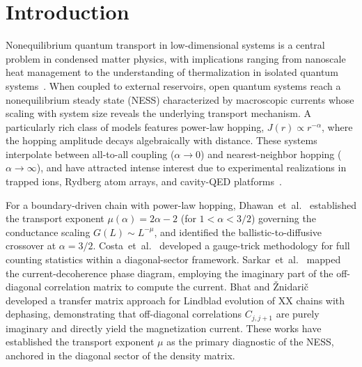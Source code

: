 \documentclass[aps,prb,twocolumn,superscriptaddress,floatfix]{revtex4-2}
\begin{document}
\section{Introduction}
\label{sec:intro}

Nonequilibrium quantum transport in low-dimensional systems is a central problem in condensed matter physics, with implications ranging from nanoscale heat management to the understanding of thermalization in isolated quantum systems~\cite{Breuer2002,Landi2022,Dhar2008,Lepri2003}. When coupled to external reservoirs, open quantum systems reach a nonequilibrium steady state (NESS) characterized by macroscopic currents whose scaling with system size reveals the underlying transport mechanism. A particularly rich class of models features power-law hopping, $J(r) \propto r^{-\alpha}$, where the hopping amplitude decays algebraically with distance. These systems interpolate between all-to-all coupling ($\alpha \to 0$) and nearest-neighbor hopping ($\alpha \to \infty$), and have attracted intense interest due to experimental realizations in trapped ions, Rydberg atom arrays, and cavity-QED platforms~\cite{Breuer2002,Landi2022,Dhar2008,Lepri2003}.

For a boundary-driven chain with power-law hopping, Dhawan~et~al.~\cite{Dhawan2024} established the transport exponent $\mu(\alpha) = 2\alpha-2$ (for $1 < \alpha < 3/2$) governing the conductance scaling $G(L) \sim L^{-\mu}$, and identified the ballistic-to-diffusive crossover at $\alpha = 3/2$. Costa~et~al.~\cite{Costa2025} developed a gauge-trick methodology for full counting statistics within a diagonal-sector framework. Sarkar~et~al.~\cite{Sarkar2024} mapped the current-decoherence phase diagram, employing the imaginary part of the off-diagonal correlation matrix to compute the current. Bhat and \v{Z}nidari\v{c}~\cite{Bhat2025} developed a transfer matrix approach for Lindblad evolution of XX chains with dephasing, demonstrating that off-diagonal correlations $C_{j,j+1}$ are purely imaginary and directly yield the magnetization current. These works have established the transport exponent $\mu$ as the primary diagnostic of the NESS, anchored in the diagonal sector of the density matrix.
\end{document}
